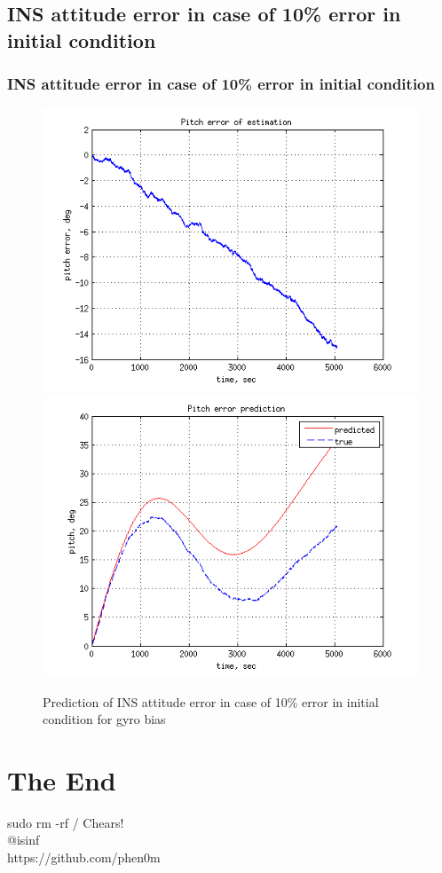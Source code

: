 \documentclass[compress]{beamer}    %
\begin{document}
\subsection{INS attitude error in case of 10\% error in initial condition}
\begin{frame}
\frametitle{INS attitude error in case of 10\% error in initial condition}
\noindent

\begin{figure}[l]
  \centering
  \includegraphics[scale=0.41]{theta_err_of_err_2}
  \includegraphics[scale=0.41]{theta_err_2}
  \caption{Prediction of  INS attitude error in case of 10\% error in initial condition for gyro bias}
  \label{fig:comp_pos}
\end{figure}
\end{frame}
\section{The End} 
\begin{frame}%
\begin{block}{sudo rm -rf / }
  \centering
  Chears! \\
  @isinf\\
  https://github.com/phen0m

\end{block}
\end{frame}

\end{document}
